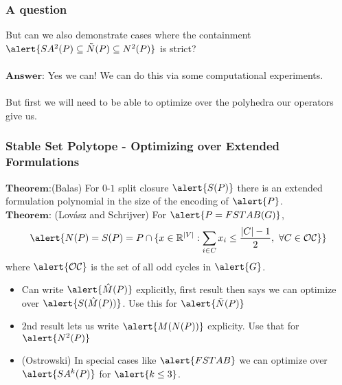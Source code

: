 \documentclass{beamer}
\begin{document}
\begin{frame}
\frametitle{A question}
But can we also demonstrate cases where the containment $\alert{SA^2(P) \subseteq \tilde{N}(P) \subseteq N^2(P)}$ is strict?\\\ \\
$\textbf{Answer:}$ Yes we can! We can do this via some computational experiments.\\\ \\
But first we will need to be able to optimize over the polyhedra our operators give us.
\end{frame}

\begin{frame}
\frametitle{Stable Set Polytope - Optimizing over Extended Formulations}
$\textbf{Theorem:}$(Balas) For $0$-$1$ split closure $\alert{S(P)}$ there is an extended formulation polynomial in the size of the encoding of $\alert{P}$.\\
$\textbf{Theorem:}$ (Lov\'asz and Schrijver) For $\alert{P = FSTAB(G)}$, $$\alert{N(P) = S(P) = P \cap \{x \in \R^{|V|} : \sum_{i \in C} x_i \leq \frac{|C|-1}{2},\ \forall C \in \mathcal{O}\mathcal{C}\}}$$
where $\alert{\mathcal{O}\mathcal{C}}$ is the set of all odd cycles in $\alert{G}$.
\begin{itemize}
\item Can write $\alert{\hat{M}(P)}$ explicitly, first result then says we can optimize over $\alert{S(\hat{M}(P))}$. Use this for $\alert{\tilde{N}(P)}$
\item $2$nd result lets us write $\alert{M(N(P))}$ explicity. Use that for $\alert{N^2(P)}$
\item (Ostrowski) In special cases like $\alert{FSTAB}$ we can optimize over $\alert{SA^k(P)}$ for $\alert{k\leq 3}$.
\end{itemize}
\end{frame}
\end{document}
